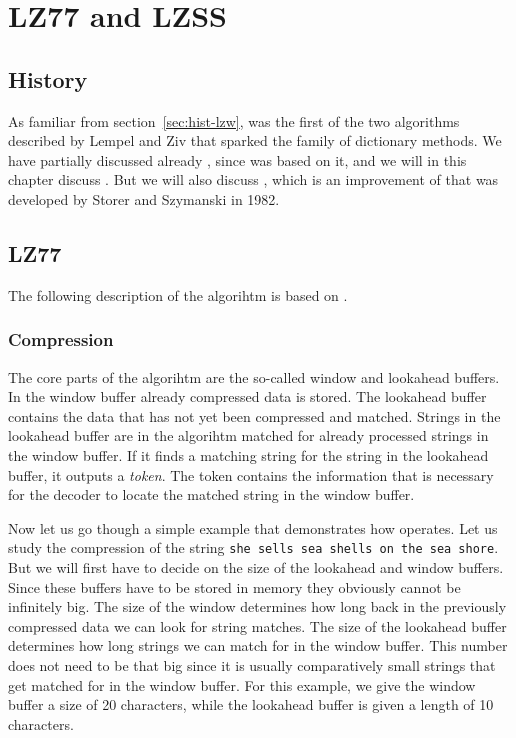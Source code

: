 \begin{comment}
  
\end{comment}

\chapter{LZ77 and LZSS}
\label{cha:lz77-lzss}

\section{History}

As familiar from section~\ref{sec:hist-lzw}, \lzone was the first of
the two algorithms described by Lempel and Ziv that sparked the family
of dictionary methods. We have partially discussed already \lztwo,
since \lzw was based on it, and we will in this chapter discuss
\lzone. But we will also discuss \lzss, which is an improvement of
\lzone that was developed by Storer and Szymanski in 1982.

\section{LZ77}

The following description of the \lzone algorihtm is based on
\cite{Salomon:2004:DCC,mark1996data_compression_book,mcfadden92:_hackin_data_compr_ziv_lempel}.

\subsection{Compression}

The core parts of the \lzone algorihtm are the so-called window and
lookahead buffers. In the window buffer already compressed data is
stored. The lookahead buffer contains the data that has not yet been
compressed and matched. Strings in the lookahead buffer are in the
algorihtm matched for already processed strings in the window
buffer. If it finds a matching string for the string in the lookahead
buffer, it outputs a \textit{token}. The token contains the
information that is necessary for the decoder to locate the matched
string in the window buffer.

Now let us go though a simple example that demonstrates how \lzone
operates. Let us study the \lzone compression of the string \texttt{she
  sells sea shells on the sea shore}. But we will first have to decide
on the size of the lookahead and window buffers. Since these buffers
have to be stored in memory they obviously cannot be infinitely
big. The size of the window determines how long back in the previously
compressed data we can look for string matches. The size of the
lookahead buffer determines how long strings we can match for in the
window buffer. This number does not need to be that big since it is
usually comparatively small strings that get matched for in the window
buffer. For this example, we give the window buffer a size of 20
characters, while the lookahead buffer is given a length of 10
characters.

